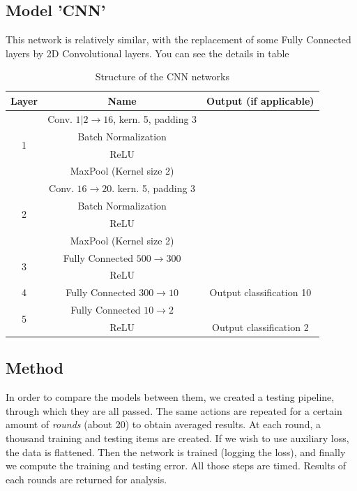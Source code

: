 \documentclass[10pt,conference]{IEEEtran}
\begin{document}
\subsection{Model 'CNN'}
This network is relatively similar, with the replacement of some Fully Connected layers by 2D Convolutional layers. You can see the details in table

\begin{table}
    \begin{tabular}{c|c||c}
        Layer & Name & Output (if applicable)\\
        \hline\hline
        \multirow{4}{*}{1} & Conv. $1|2 \to 16$, kern. 5, padding 3\\
        & Batch Normalization\\
        & ReLU\\
        & MaxPool (Kernel size 2)\\
        \hline
        \multirow{4}{*}{2} & Conv. $16 \to 20$. kern. 5, padding 3\\
        & Batch Normalization\\
        & ReLU\\
        & MaxPool (Kernel size 2)\\
        \hline
        \multirow{2}{*}{3} & Fully Connected $500 \to 300$\\
        & ReLU\\
        \hline
        4 & Fully Connected $300 \to 10$ & Output classification 10\\
        \hline
        \multirow{2}{*}{5} & Fully Connected $10 \to 2$\\
        & ReLU & Output classification 2
    \end{tabular}
    \caption{Structure of the CNN networks}
    \label{tab:struct_cnn}
\end{table}

\subsection{Method}
In order to compare the models between them, we created a testing pipeline, through which they are all passed. The same actions are repeated for a certain amount of \textit{rounds} (about 20) to obtain averaged results. At each round, a thousand training and testing items are created. If we wish to use auxiliary loss, the data is flattened. Then the network is trained (logging the loss), and finally we compute the training and testing error. All those steps are timed. Results of each rounds are returned for analysis.
\end{document}
